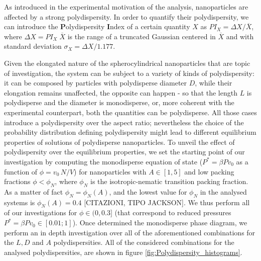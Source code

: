 \documentclass[journal=jacsat,manuscript=article]{achemso}
\begin{document}

As introduced in the experimental motivation of the analysis, nanoparticles are affected by a strong polydispersity. In order to quantify their polydispersity, we can introduce the \textbf{P}olydispersity \textbf{I}ndex of a certain quantity $X$ as $PI_X = \Delta X / \overline{X}$, where $\Delta X = PI_X \; \overline{X}$ is the range of a truncated Gaussian centered in $\overline{X}$ and with standard deviation $\sigma_X = {\Delta X}/{ 1.177}$.

Given the elongated nature of the spherocylindrical nanoparticles that are topic of investigation, the system can be subject to a variety of kinds of polydispersity: it can be composed by particles with polydisperse diameter $D$, while their elongation remains unaffected, the opposite can happen - so that the length $L$ is polydisperse and the diameter is monodisperse, or, more coherent with the experimental counterpart, both the quantities can be polydisperse. All those cases introduce a polydispersity over the aspect ratio; nevertheless the choice of the probability distribution defining polydispersity might lead to different equilibrium properties of solutions of polydisperse nanoparticles. To unveil the effect of polydispersity over the equilibrium properties, we  set the starting point of our investigation by computing the monodisperse equation of state ($P^* = \beta P v_0$ as a function of $\phi = v_0 \, N / V$) for nanoparticles with  $A \in [1,5]$ and low packing fractions $\phi < \phi_{N}$, where $\phi_N$ is the isotropic-nematic transition packing fraction.  As a matter of fact $\phi_N=\phi_N(A)$, and the lowest value for $\phi_N$ in the analysed systems is $\phi_N(A)=0.4$ [CITAZIONI, TIPO JACKSON]. We thus perform all of our investigations for $\phi \in (0,0.3]$ (that correspond to reduced pressures $P^* = \beta P v_0 \in [0.01; 1]$). Once determined the monodisperse phase diagram, we perform an in depth investigation over all of the aforementioned combinations for the $L,D$ and $A$ polydispersities. All of the considered combinations for the analysed polydispersities, are shown in figure \ref{fig:Polydispersity_histograms}. 
\end{document}
